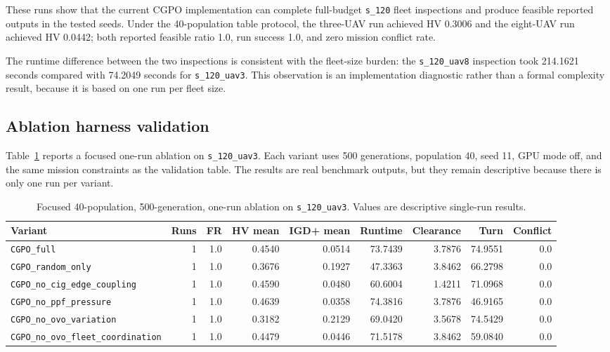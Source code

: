 \documentclass[a4paper,fleqn]{cas-dc}
\begin{document}
These runs show that the current CGPO implementation can complete full-budget \texttt{s\_120} fleet inspections and produce feasible reported outputs in the tested seeds. Under the 40-population table protocol, the three-UAV run achieved HV 0.3006 and the eight-UAV run achieved HV 0.0442; both reported feasible ratio 1.0, run success 1.0, and zero mission conflict rate.

The runtime difference between the two inspections is consistent with the fleet-size burden: the \texttt{s\_120\_uav8} inspection took 214.1621 seconds compared with 74.2049 seconds for \texttt{s\_120\_uav3}. This observation is an implementation diagnostic rather than a formal complexity result, because it is based on one run per fleet size.

\subsection{Ablation harness validation}

Table~\ref{tab:focused-ablation} reports a focused one-run ablation on \texttt{s\_120\_uav3}. Each variant uses 500 generations, population 40, seed 11, GPU mode off, and the same mission constraints as the validation table. The results are real benchmark outputs, but they remain descriptive because there is only one run per variant.

\begin{table}[t]
\centering
\scriptsize
\caption{Focused 40-population, 500-generation, one-run ablation on \texttt{s\_120\_uav3}. Values are descriptive single-run results.}
\label{tab:focused-ablation}
\begin{tabular}{lrrrrrrrr}
\toprule
Variant & Runs & FR & HV mean & IGD+ mean & Runtime & Clearance & Turn & Conflict \\
\midrule
\texttt{CGPO\_full} & 1 & 1.0 & 0.4540 & 0.0514 & 73.7439 & 3.7876 & 74.9551 & 0.0 \\
\texttt{CGPO\_random\_only} & 1 & 1.0 & 0.3676 & 0.1927 & 47.3363 & 3.8462 & 66.2798 & 0.0 \\
\texttt{CGPO\_no\_cig\_edge\_coupling} & 1 & 1.0 & 0.4590 & 0.0480 & 60.6004 & 1.4211 & 71.0968 & 0.0 \\
\texttt{CGPO\_no\_ppf\_pressure} & 1 & 1.0 & 0.4639 & 0.0358 & 74.3816 & 3.7876 & 46.9165 & 0.0 \\
\texttt{CGPO\_no\_ovo\_variation} & 1 & 1.0 & 0.3182 & 0.2129 & 69.0420 & 3.5678 & 74.5429 & 0.0 \\
\texttt{CGPO\_no\_ovo\_fleet\_coordination} & 1 & 1.0 & 0.4479 & 0.0446 & 71.5178 & 3.8462 & 59.0840 & 0.0 \\
\bottomrule
\end{tabular}
\end{table}
\end{document}
